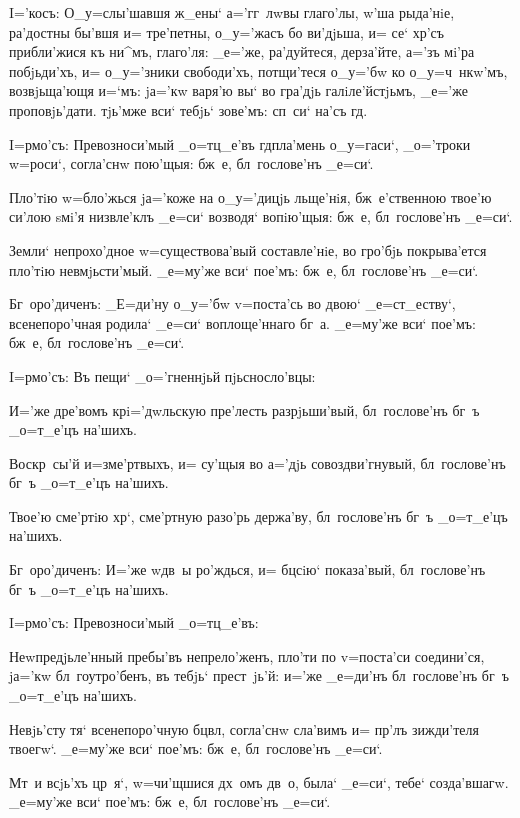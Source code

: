 I='косъ: О_у=слы'шавшя ж_ены` а='гг~лwвы глаго'лы, 
w'ша рыда'нiе, ра'достны бы'вшя и= тре'петны, 
о_у='жасъ бо ви'дjьша, и= се` хр'съ прибли'жися къ 
ни^мъ, глаго'ля: _е='же, ра'дуйтеся, дерза'йте, а='зъ 
мi'ра побjьди'хъ, и= о_у='зники свободи'хъ, потщи'теся 
о_у='бw ко о_у=ч~нкw'мъ, возвjьща'ющя и=`мъ: jа='кw 
варя'ю вы` во гра'дjь галiле'йстjьмъ, _е='же 
проповjь'дати. тjь'мже вси` тебjь` зове'мъ: сп~си` на'съ 
гд.


I=рмо'съ: Превозноси'мый _о=тц_е'въ гд пла'мень 
о_у=гаси`, _о='троки w=роси`, согла'снw пою'щыя: бж~е, 
бл~гослове'нъ _е=си`.

Пло'тiю w=бло'жься jа='коже на о_у='дицjь льще'нiя, 
бж~е'ственною твое'ю си'лою sмi'я низвле'клъ _е=си` 
возводя` вопiю'щыя: бж~е, бл~гослове'нъ _е=си`.

Земли` непрохо'дное w=существова'вый составле'нiе, во 
гро'бjь покрыва'ется пло'тiю невмjьсти'мый. _е=му'же вси` 
пое'мъ: бж~е, бл~гослове'нъ _е=си`.

Бг~оро'диченъ: _Е=ди'ну о_у='бw v=поста'сь во двою` 
_е=ст_еству`, всенепоро'чная родила` _е=си` воплоще'ннаго 
бг~а. _е=му'же вси` пое'мъ: бж~е, бл~гослове'нъ _е=си`.

 I=рмо'съ: Въ пещи` _о='гненнjьй пjьсносло'вцы: 

И='же дре'вомъ кр i='дwльскую пре'лесть 
разрjьши'вый, бл~гослове'нъ бг~ъ _о=т_е'цъ на'шихъ.

Воскр~сы'й и=з\ъ ме'ртвыхъ, и= су'щыя во а='дjь 
совоздви'гнувый, бл~гослове'нъ бг~ъ _о=т_е'цъ на'шихъ. 

Твое'ю сме'ртiю хр`, сме'ртную разо'рь держа'ву, 
бл~гослове'нъ бг~ъ _о=т_е'цъ на'шихъ.

Бг~оро'диченъ: И='же w\т дв~ы ро'ждься, и= бц сiю` 
показа'вый, бл~гослове'нъ бг~ъ _о=т_е'цъ на'шихъ. 

 I=рмо'съ: Превозноси'мый _о=тц_е'въ:

Неwпредjьле'нный пребы'въ непрело'женъ, пло'ти по 
v=поста'си соедини'ся, jа='кw бл~гоутро'бенъ, въ тебjь` 
прест~jь'й: и='же _е=ди'нъ бл~гослове'нъ бг~ъ _о=т_е'цъ 
на'шихъ.

Невjь'сту тя` всенепоро'чную бц вл, согла'снw 
сла'вимъ и= пр'лъ зижди'теля твоегw`. _е=му'же вси` 
пое'мъ: бж~е, бл~гослове'нъ _е=си`.

Мт~и всjь'хъ цр~я`, w=чи'щшися дх~омъ дв~о, была` 
_е=си`, тебе` созда'вшагw. _е=му'же вси` пое'мъ: бж~е, 
бл~гослове'нъ _е=си`.

